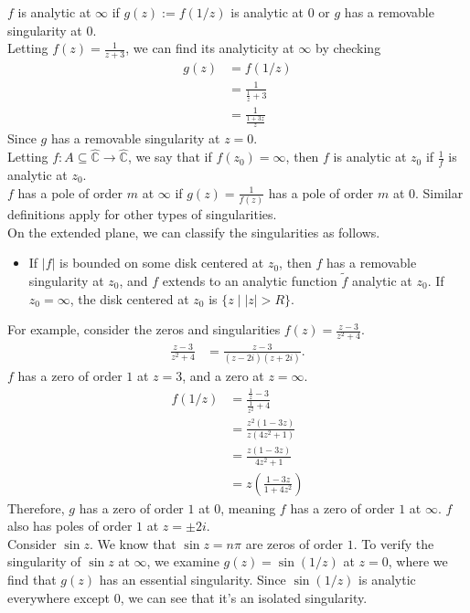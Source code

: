 \documentclass[10pt]{extarticle}
\newcommand{\C}{\mathbb{C}}
\begin{document}
  $f$ is analytic at $\infty$ if $g(z) := f(1/z)$ is analytic at $0$ or $g$ has a removable singularity at $0$.\\

  Letting $f(z) = \frac{1}{z+3}$, we can find its analyticity at $\infty$ by checking
  \begin{align*}
    g(z) &= f(1/z)\\
         &= \frac{1}{\frac{1}{z} + 3}\\
         &= \frac{1}{\frac{1+3z}{z}}
  \end{align*}
  Since $g$ has a removable singularity at $z=0$.\\

  Letting $f: A\subseteq \hat{\C}\rightarrow \hat{\C}$, we say that if $f(z_0) = \infty$, then $f$ is analytic at $z_0$ if $\frac{1}{f}$ is analytic at $z_0$.\\

  $f$ has a pole of order $m$ at $\infty$ if $g(z) = \frac{1}{f(z)}$ has a pole of order $m$ at $0$. Similar definitions apply for other types of singularities.\\

  On the extended plane, we can classify the singularities as follows.
  \begin{itemize}
    \item If $|f|$ is bounded on some disk centered at $z_0$, then $f$ has a removable singularity at $z_0$, and $f$ extends to an analytic function $\tilde{f}$ analytic at $z_0$. If $z_0 = \infty$, the disk centered at $z_0$ is $\{z\mid |z| > R\}$.
  \end{itemize}
  For example, consider the zeros and singularities $f(z) = \frac{z-3}{z^2 + 4}$.
  \begin{align*}
    \frac{z-3}{z^2 + 4} &= \frac{z-3}{(z-2i)(z+2i)}.
  \end{align*}
  $f$ has a zero of order $1$ at $z = 3$, and a zero at $z = \infty$.
  \begin{align*}
    f(1/z) &= \frac{\frac{1}{z} - 3}{\frac{1}{z^2} + 4}\\
           &= \frac{z^2(1-3z)}{z(4z^2 + 1)}\\
           &= \frac{z(1-3z)}{4z^2 + 1}\\
           &= z\left(\frac{1-3z}{1+4z^2}\right)
  \end{align*}
  Therefore, $g$ has a zero of order $1$ at $0$, meaning $f$ has a zero of order $1$ at $\infty$. $f$ also has poles of order $1$ at $z = \pm 2i$.\\

  Consider $\sin z$. We know that $\sin z = n\pi$ are zeros of order $1$. To verify the singularity of $\sin z$ at $\infty$, we examine $g(z) = \sin(1/z)$ at $z=0$, where we find that $g(z)$ has an essential singularity. Since $\sin (1/z)$ is analytic everywhere except $0$, we can see that it's an isolated singularity.
\end{document}
